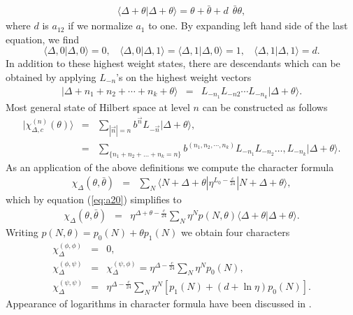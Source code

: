 \documentclass[a4paper,11pt]{article}
\begin{document}
\begin{eqnarray}\label{eq:a18}
\langle \Delta+\theta|\Delta+\theta\rangle=\theta+
\bar{\theta}+d\:\: \bar{\theta}\theta,
\end{eqnarray}
where $d$ is $a_{12}$ if we normalize $a_{1}$ to one. By expanding
left hand side of the last equation, we find
\begin{equation}\label{eq:a19}
\langle \Delta,0|\Delta,0\rangle=0,\:\:\:\:\langle
\Delta,0|\Delta,1\rangle=\langle
\Delta,1|\Delta,0\rangle=1,\:\:\:\:\langle
\Delta,1|\Delta,1\rangle=d.
\end{equation}
In addition to these highest weight states, there are descendants
which can be obtained by applying $L_{-n}$'s on the highest
weight vectors
\begin{eqnarray}\label{eq:a20}
|\Delta+n_{1}+n_{2}+\cdots +n_{k}+\theta\rangle &=&
L_{-n_{1}}L_{-n{2}}\cdots L_{-n_{k}}|\Delta+\theta\rangle.
\end{eqnarray}
Most general state of Hilbert space at level $n$ can be
constructed as follows
\begin{eqnarray}\label{eq:a21}
|\chi_{\Delta,c}^{(n)}(\theta)\rangle&=&\sum_{|\vec{n}|=n}b^{\vec{n}}L_{-\vec{n}}|\Delta+\theta\rangle,\nonumber\\
&=&\sum_{\{n_{1}+n_{2}+\ldots+n_{k}=n\}} b^{(n_{1},n_{2},\cdots,
n_{k})}L_{-n_{1}}L_{-n_{2}}\ldots,
L_{-n_{k}}|\Delta+\theta\rangle.
\end{eqnarray}
As an application of the above definitions we compute  the
character formula
\begin{eqnarray}\label{eq:a22}
\chi_{\Delta}(\theta,\bar{\theta})&=&\sum_{N}\langle
N+\Delta+\theta| \eta^{L_{0}-\frac{c}{24}}|N+\Delta+\theta\rangle,
\end{eqnarray}
which by equation (\ref{eq:a20}) simplifies to
\begin{eqnarray}\label{eq:a23}
\chi_{\Delta}(\theta,\bar{\theta})&=&\eta^{\Delta+\theta-\frac{c}{24}}
\sum_{N} \eta^{N}p(N,\theta)\langle \Delta+\theta
|\Delta+\theta\rangle .
\end{eqnarray}
Writing $p(N,\theta)=p_{0}(N)+\theta p_{1}(N)$ we obtain four
characters
\begin{eqnarray}\label{eq:a24}
\chi_{\Delta}^{(\phi,\phi)}&=&0 ,\nonumber\\
\chi_{\Delta}^{(\phi,\psi)}&=&\chi_{\Delta}^{(\psi,\phi)}=
\eta^{\Delta-\frac{c}{24}}\sum_{N} \eta^{N}p_{0}(N) ,\nonumber\\
 \chi_{\Delta}^{(\psi,\psi)}&=&\eta^{\Delta-\frac{c}{24}}\sum_{N}
\eta^{N}\left[p_{1}(N)+(d+\ln\eta)p_{0}(N)\right] .
\end{eqnarray}
Appearance of logarithms in character formula have been discussed
in \cite{floh1,kog}.
\end{document}
